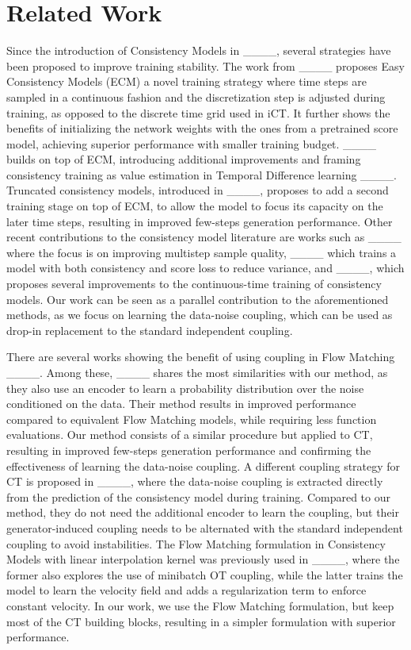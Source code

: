 \section{Related Work}
Since the introduction of Consistency Models in ____, several strategies have been proposed to improve training stability. The work from ____ proposes Easy Consistency Models (ECM) a novel training strategy where time steps are sampled in a continuous fashion and the discretization step is adjusted during training, as opposed to the discrete time grid used in iCT. It further shows the benefits of initializing the network weights with the ones from a pretrained score model, achieving superior performance with smaller training budget. ____ builds on top of ECM, introducing additional improvements and framing consistency training as value estimation in Temporal Difference learning ____. Truncated consistency models, introduced in ____, proposes to add a second training stage on top of ECM, to allow the model to focus its capacity on the later time steps, resulting in improved few-steps generation performance. Other recent contributions to the consistency model literature are works such as ____ where the focus is on improving multistep sample quality, ____ which trains a model with both consistency and score loss to reduce variance, and ____, which proposes several improvements to the continuous-time training of consistency models. Our work can be seen as a parallel contribution to the aforementioned methods, as we focus on learning the data-noise coupling, which can be used as drop-in replacement to the standard independent coupling.

There are several works showing the benefit of using coupling in Flow Matching ____. Among these, ____ shares the most similarities with our method, as they also use an encoder to learn a probability distribution over the noise conditioned on the data. Their method results in improved performance compared to equivalent Flow Matching models, while requiring less function evaluations. Our method consists of a similar procedure but applied to CT, resulting in improved few-steps generation performance and confirming the effectiveness of learning the data-noise coupling. A different coupling strategy for CT is proposed in ____, where the data-noise coupling is extracted directly from the prediction of the consistency model during training. Compared to our method, they do not need the additional encoder to learn the coupling, but their generator-induced coupling needs to be alternated with the standard independent coupling to avoid instabilities. The Flow Matching formulation in Consistency Models with linear interpolation kernel was previously used in ____, where the former also explores the use of minibatch OT coupling, while the latter trains the model to learn the velocity field and adds a regularization term to enforce constant velocity. In our work, we use the Flow Matching formulation, but keep most of the CT building blocks, resulting in a simpler formulation with superior performance.